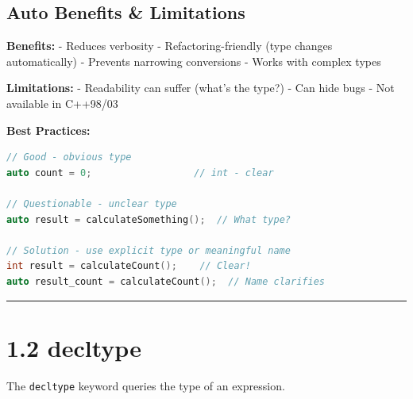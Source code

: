 \hypertarget{auto-benefits-limitations}{%
\subsection{Auto Benefits \&
Limitations}\label{auto-benefits-limitations}}

\textbf{Benefits:} - Reduces verbosity - Refactoring-friendly (type
changes automatically) - Prevents narrowing conversions - Works with
complex types

\textbf{Limitations:} - Readability can suffer (what's the type?) - Can
hide bugs - Not available in C++98/03

\textbf{Best Practices:}

\begin{lstlisting}[language={C++}]
// Good - obvious type
auto count = 0;                  // int - clear

// Questionable - unclear type
auto result = calculateSomething();  // What type?

// Solution - use explicit type or meaningful name
int result = calculateCount();    // Clear!
auto result_count = calculateCount();  // Name clarifies
\end{lstlisting}

\begin{center}\rule{0.5\linewidth}{0.5pt}\end{center}

\hypertarget{decltype}{%
\section{1.2 decltype}\label{decltype}}

The \passthrough{\lstinline!decltype!} keyword queries the type of an
expression.


